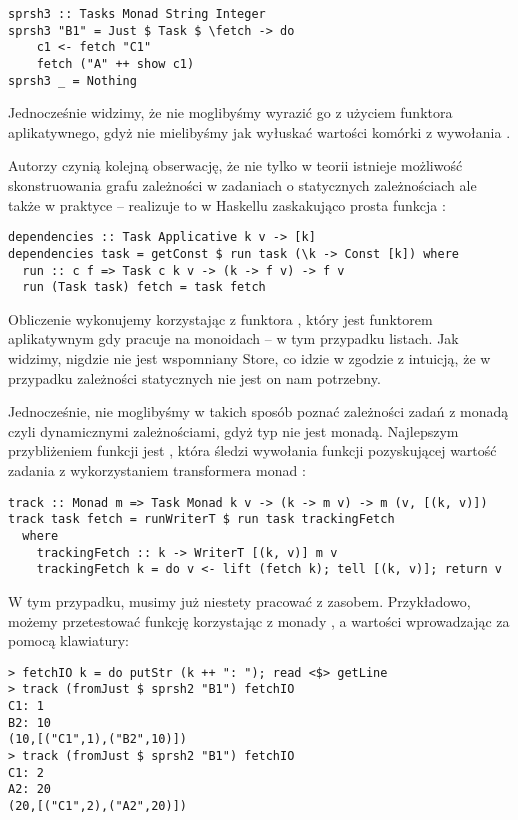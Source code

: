 \begin{lstlisting}
sprsh3 :: Tasks Monad String Integer
sprsh3 "B1" = Just $ Task $ \fetch -> do
    c1 <- fetch "C1"
    fetch ("A" ++ show c1)
sprsh3 _ = Nothing
\end{lstlisting}

Jednocześnie widzimy, że nie moglibyśmy wyrazić go z użyciem funktora aplikatywnego, gdyż nie mielibyśmy jak wyłuskać wartości komórki z wywołania .

Autorzy czynią kolejną obserwację, że nie tylko w teorii istnieje możliwość skonstruowania grafu zależności w zadaniach o statycznych zależnościach ale także w praktyce -- realizuje to w Haskellu zaskakująco prosta funkcja :

\begin{lstlisting}
dependencies :: Task Applicative k v -> [k]
dependencies task = getConst $ run task (\k -> Const [k]) where
  run :: c f => Task c k v -> (k -> f v) -> f v
  run (Task task) fetch = task fetch
\end{lstlisting}

Obliczenie wykonujemy korzystając z funktora , który jest funktorem aplikatywnym gdy pracuje na monoidach -- w tym przypadku listach. Jak widzimy, nigdzie nie jest wspomniany Store, co idzie w zgodzie z intuicją, że w przypadku zależności statycznych nie jest on nam potrzebny.

Jednocześnie, nie moglibyśmy w takich sposób poznać zależności zadań z monadą czyli dynamicznymi zależnościami, gdyż typ  nie jest monadą. Najlepszym przybliżeniem funkcji  jest , która śledzi wywołania funkcji pozyskującej wartość zadania z wykorzystaniem transformera monad :

\begin{lstlisting}
track :: Monad m => Task Monad k v -> (k -> m v) -> m (v, [(k, v)])
track task fetch = runWriterT $ run task trackingFetch
  where
    trackingFetch :: k -> WriterT [(k, v)] m v
    trackingFetch k = do v <- lift (fetch k); tell [(k, v)]; return v
\end{lstlisting}

W tym przypadku, musimy już niestety pracować z zasobem. Przykładowo, możemy przetestować funkcję  korzystając z monady , a wartości wprowadzając za pomocą klawiatury:

\begin{lstlisting}
> fetchIO k = do putStr (k ++ ": "); read <$> getLine
> track (fromJust $ sprsh2 "B1") fetchIO
C1: 1
B2: 10
(10,[("C1",1),("B2",10)])
> track (fromJust $ sprsh2 "B1") fetchIO
C1: 2
A2: 20
(20,[("C1",2),("A2",20)])

\end{lstlisting}

